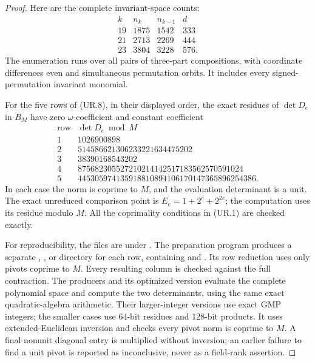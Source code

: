 \begin{proof}
Here are the complete invariant-space counts:
\[
 \begin{array}{c|r|r|r}
 k&n_k&n_{k-1}&d\\ \hline
 19&1875&1542&333\\
 21&2713&2269&444\\
 23&3804&3228&576.
 \end{array}
 \tag{UR.9}
\]
The enumeration runs over all pairs of three-part
compositions, with coordinate differences even and simultaneous
permutation orbits. It includes every signed-permutation
invariant monomial.

For the five rows of (UR.8), in their displayed order, the exact
residues of $\det D_e$ in $B_M$ have zero $\omega$-coefficient
and constant coefficient
\[
 \begin{array}{c|r}
 \text{row}&\det D_e\bmod M\\ \hline
 1&1026900898\\
 2&514586621306233221634475202\\
 3&38390168543202\\
 4&875682305527210214142517183562570591024\\
 5&445305974135918810894106170147365896254386.
 \end{array}
 \tag{UR.10}
\]
In each case the norm is coprime to $M$, and the evaluation
determinant is a unit. The exact unreduced comparison point is
$E_e=1+2^e+2^{2e}$; the computation uses its residue modulo $M$.
All the coprimality conditions in (UR.1) are checked exactly.

For reproducibility, the files are under
. The preparation program
 produces a separate
, , or  directory for each row,
containing  and . Its row
reduction uses only pivots coprime to $M$. Every resulting
column is checked against the full contraction. The producers
 and its optimized version
 evaluate the complete polynomial
space and compute the two determinants, using the same exact
quadratic-algebra arithmetic. Their larger-integer
versions use exact GMP integers; the smaller cases use
64-bit residues and 128-bit products. It uses extended-Euclidean
inversion and checks every pivot norm is coprime to $M$.
A final nonunit diagonal entry is multiplied without inversion;
an earlier failure to find a unit pivot is reported as
inconclusive, never as a field-rank assertion.


\end{proof}
